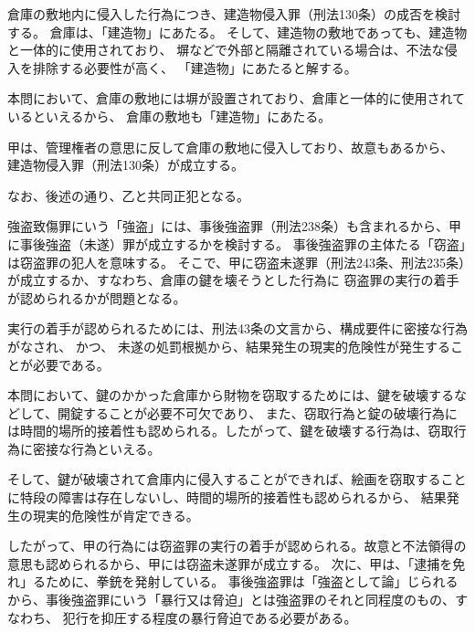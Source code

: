 \documentclass[11pt]{jsarticle}
\title{\vspace{-30mm}{\textgt{\Large{\fbox{５} ピカソ盗取計画}}}}
\date{\vspace{-15mm}}
\begin{document}
\maketitle

	\sectionB{}
		倉庫の敷地内に侵入した行為につき、建造物侵入罪（刑法130条）の成否を検討する。
		倉庫は、「建造物」にあたる。
		そして、建造物の敷地であっても、建造物と一体的に使用されており、
		塀などで外部と隔離されている場合は、不法な侵入を排除する必要性が高く、
		「建造物」にあたると解する。
		
		本問において、倉庫の敷地には塀が設置されており、倉庫と一体的に使用されているといえるから、
		倉庫の敷地も「建造物」にあたる。
		
		甲は、管理権者の意思に反して倉庫の敷地に侵入しており、故意もあるから、
		建造物侵入罪（刑法130条）が成立する。
		
		なお、後述の通り、乙と共同正犯となる。
	
	
		強盗致傷罪にいう「強盗」には、事後強盗罪（刑法238条）も含まれるから、甲に事後強盗（未遂）罪が成立するかを検討する。
			\sectionC{}
				事後強盗罪の主体たる「窃盗」は窃盗罪の犯人を意味する。
				そこで、甲に窃盗未遂罪（刑法243条、刑法235条）が成立するか、すなわち、倉庫の鍵を壊そうとした行為に
				窃盗罪の実行の着手が認められるかが問題となる。
				
				実行の着手が認められるためには、刑法43条の文言から、構成要件に密接な行為がなされ、
				かつ、
				未遂の処罰根拠から、結果発生の現実的危険性が発生することが必要である。
				
				本問において、鍵のかかった倉庫から財物を窃取するためには、鍵を破壊するなどして、開錠することが必要不可欠であり、
				また、窃取行為と錠の破壊行為には時間的場所的接着性も認められる。したがって、鍵を破壊する行為は、窃取行為に密接な行為といえる。
				
				そして、鍵が破壊されて倉庫内に侵入することができれば、絵画を窃取することに特段の障害は存在しないし、時間的場所的接着性も認められるから、
				結果発生の現実的危険性が肯定できる。
				
				したがって、甲の行為には窃盗罪の実行の着手が認められる。故意と不法領得の意思も認められるから、甲には窃盗未遂罪が成立する。
			\sectionC{}
				次に、甲は、「逮捕を免れ」るために、拳銃を発射している。
			\sectionC{}
				事後強盗罪は「強盗として論」じられるから、事後強盗罪にいう「暴行又は脅迫」とは強盗罪のそれと同程度のもの、すなわち、
				犯行を抑圧する程度の暴行脅迫である必要がある。
				
\end{document}
